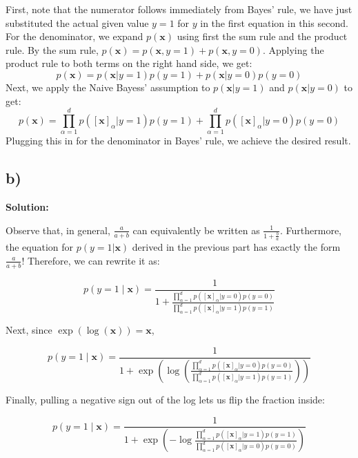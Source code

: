 \documentclass[a4paper]{article}
\begin{document}
First, note that the numerator follows immediately from Bayes' rule, we have just substituted the actual given value $y=1$ for $y$ in the first equation in this second. For the denominator, we expand $p(\textbf{x})$ using first the sum rule and the product rule. By the sum rule, $p(\textbf{x})=p(\textbf{x},y=1)+p(\textbf{x},y=0)$. Applying the product rule to both terms on the right hand side, we get:
\begin{equation*}
	p(\textbf{x}) = p(\textbf{x}|y=1)p(y=1)+p(\textbf{x}|y=0)p(y=0)
\end{equation*}
Next, we apply the Naive Bayess' assumption to $p(\textbf{x}|y=1)$ and $p(\textbf{x}|y=0)$ to get:
\begin{equation*}
	p(\textbf{x}) = \prod_{\alpha=1}^{d} p([\textbf{x}]_{\alpha}|y=1)p(y=1)+\prod_{\alpha=1}^{d} p([\textbf{x}]_{\alpha}|y=0)p(y=0)
\end{equation*}
Plugging this in for the denominator in Bayes' rule, we achieve the desired result.


\subsection*{b)}


\textbf{Solution:}



Observe that, in general, $\frac{a}{a+b}$ can equivalently be written as $\frac{1}{1+\frac{b}{a}}$. Furthermore, the equation for $p(y=1|\textbf{x})$ derived in the previous part has exactly the form $\frac{a}{a+b}$! Therefore, we can rewrite it as:

\begin{equation*}
	p(y=1 \mid \textbf{x})=\frac{1}{1+\frac{\prod_{\alpha=1}^{d} p([\textbf{x}]_{\alpha}|y=0)p(y=0)}{\prod_{\alpha=1}^{d} p([\textbf{x}]_{\alpha}|y=1)p(y=1)}}
\end{equation*}

Next, since $\exp(\log(\textbf{x}))=\textbf{x}$,

\begin{equation*}
	p(y=1 \mid \textbf{x})=\frac{1}{1+\exp\left(\log\left(\frac{\prod_{\alpha=1}^{d} p([\textbf{x}]_{\alpha}|y=0)p(y=0)}{\prod_{\alpha=1}^{d} p([\textbf{x}]_{\alpha}|y=1)p(y=1)}\right)\right)}
\end{equation*}

Finally, pulling a negative sign out of the log lets us flip the fraction inside:

\begin{equation*}
p(y=1 \mid \textbf{x}) = \frac{1}{1+\exp{\left(-\log\frac{\prod_{\alpha=1}^{d} p([\textbf{x}]_{\alpha}|y=1)p(y=1)}{\prod_{\alpha=1}^{d} p([\textbf{x}]_{\alpha}|y=0)p(y=0)}\right)}}
\end{equation*}
\end{document}
